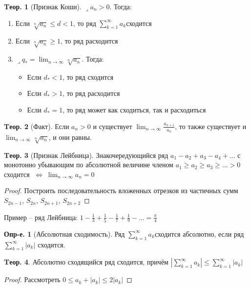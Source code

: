 \documentclass[a4paper,12pt]{article}
\numberwithin{figure}{section}
\theoremstyle{definition}
\newtheorem{definition}{Опр-е.}[section]
\newtheorem{theorem}{Tеор.}[section]
\def\DS{\displaystyle}
\def\ntoinf{n\to\infty}
\def\leqs{\leqslant}
\def\geqs{\geqslant}
\def\lets{{\huge$\lrcorner$}\space}
\def\iff{$\;\Longleftrightarrow\;$}
\def\rowak{$\DS\sum_{k=1}^{\infty}a_k$\space}
\begin{document}
\begin{theorem}[Признак Коши]
	\lets $a_n>0$. Тогда:
	\begin{enumerate}
		\item Если $\DS\sqrt[n]{a_n} \leqs d < 1$, то ряд \rowak сходится
		\item Если $\DS\sqrt[n]{a_n} \geqs 1$, то ряд расходится
		\item \lets $\DS q_* = \lim_{\ntoinf} \sqrt[n]{a_n}$. Тогда:
		\begin{itemize}
			\item Если $d_* < 1$, то ряд сходится
			\item Если $d_* > 1$, то ряд расходится
			\item Если $d_* = 1$, то ряд может как сходиться, так и расходиться
		\end{itemize}
	\end{enumerate}
\end{theorem}

\begin{theorem}[Факт]
	Если $a_n>0$ и существует $\DS \lim_{\ntoinf} \frac{a_{n+1}}{a_n}$,
	то также существует и $\DS \lim_{\ntoinf} \sqrt[n]{a_n}$, и они равны.
\end{theorem}


\begin{theorem}[Признак Лейбница]
	Знакочередующийся ряд $a_1 - a_2 + a_3 - a_4 + ...$
	с монотонно убывающим по абсолютной величине членом
	$a_1 \geqs a_2 \geqs a_3 \geqs ... > 0$
	сходится \iff $\DS \lim_{\ntoinf} a_n = 0$
\end{theorem}
\begin{proof}
	Построить последовательность вложенных отрезков из частичных сумм
	$S_{2n-1}$, $S_{2n}$, $S_{2n+1}$, $S_{2n+2}$
\end{proof}


Пример -- ряд Лейбница: $\DS 1-\frac13+\frac15-\frac17+\frac19-... = \frac\pi4$



\begin{definition}[Абсолютная сходимость]
	Ряд \rowak сходится абсолютно,
	если ряд $\DS\sum_{k=1}^{\infty}|a_k|$ сходится.
\end{definition}

\begin{theorem}
	Абсолютно сходящийся ряд сходится, причём
	$\DS \left|\sum_{k=1}^{\infty}a_k\right| \leqs \sum_{k=1}^{\infty}|a_k|$
\end{theorem}
\begin{proof} Рассмотреть $0 \leqs a_k + |a_k| \leqs 2|a_k|$ \end{proof}
\end{document}

